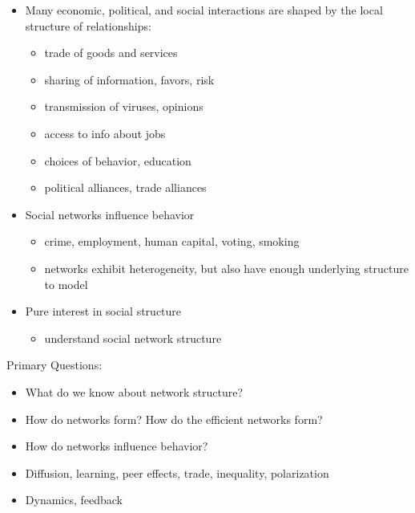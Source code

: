 \documentclass[
]{article}
\providecommand{\tightlist}{%
  \setlength{\itemsep}{0pt}\setlength{\parskip}{0pt}}
\begin{document}
\begin{itemize}
\tightlist
\item
  Many economic, political, and social interactions are shaped by the local\\
  structure of relationships:

  \begin{itemize}
  \tightlist
  \item
    trade of goods and services\\
  \item
    sharing of information, favors, risk
  \item
    transmission of viruses, opinions
  \item
    access to info about jobs\\
  \item
    choices of behavior, education\\
  \item
    political alliances, trade alliances
  \end{itemize}
\item
  Social networks influence behavior

  \begin{itemize}
  \tightlist
  \item
    crime, employment, human capital, voting, smoking
  \item
    networks exhibit heterogeneity, but also have enough underlying structure to model\\
  \end{itemize}
\item
  Pure interest in social structure

  \begin{itemize}
  \tightlist
  \item
    understand social network structure
  \end{itemize}
\end{itemize}

Primary Questions:

\begin{itemize}
\tightlist
\item
  What do we know about network structure?\\
\item
  How do networks form? How do the efficient networks form?
\item
  How do networks influence behavior?
\item
  Diffusion, learning, peer effects, trade, inequality, polarization\\
\item
  Dynamics, feedback
\end{itemize}
\end{document}
